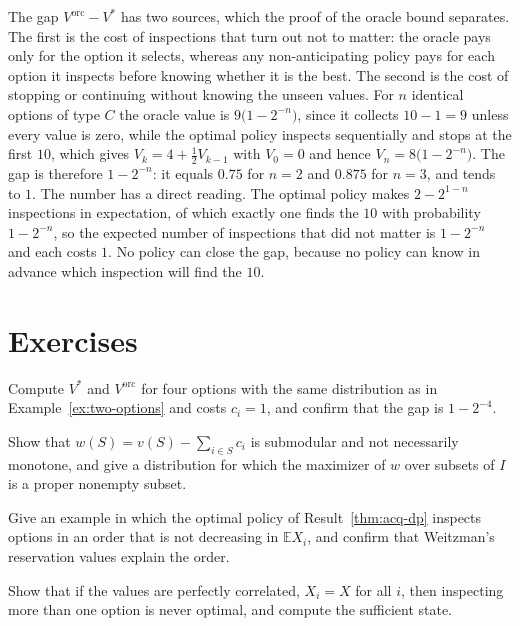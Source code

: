 The gap $V^{\mathrm{orc}}-V^{*}$ has two sources, which the proof of the oracle bound separates. The first is the cost of inspections that turn out not to matter: the oracle pays only for the option it selects, whereas any non-anticipating policy pays for each option it inspects before knowing whether it is the best. The second is the cost of stopping or continuing without knowing the unseen values. For $n$ identical options of type $C$ the oracle value is $9\bigl(1-2^{-n}\bigr)$, since it collects $10-1=9$ unless every value is zero, while the optimal policy inspects sequentially and stops at the first $10$, which gives $V_k=4+\tfrac12V_{k-1}$ with $V_0=0$ and hence $V_n=8\bigl(1-2^{-n}\bigr)$. The gap is therefore $1-2^{-n}$: it equals $0.75$ for $n=2$ and $0.875$ for $n=3$, and tends to $1$. The number has a direct reading. The optimal policy makes $2-2^{1-n}$ inspections in expectation, of which exactly one finds the $10$ with probability $1-2^{-n}$, so the expected number of inspections that did not matter is $1-2^{-n}$ and each costs $1$. No policy can close the gap, because no policy can know in advance which inspection will find the $10$.

\section*{Exercises}

\begin{exercise}
Compute $V^{*}$ and $V^{\mathrm{orc}}$ for four options with the same distribution as in Example~\ref{ex:two-options} and costs $c_i=1$, and confirm that the gap is $1-2^{-4}$.
\end{exercise}

\begin{exercise}\label{ex:marginal}
Show that $w(S)=v(S)-\sum_{i\in S}c_i$ is submodular and not necessarily monotone, and give a distribution for which the maximizer of $w$ over subsets of $I$ is a proper nonempty subset.
\end{exercise}

\begin{exercise}
Give an example in which the optimal policy of Result~\ref{thm:acq-dp} inspects options in an order that is not decreasing in $\mathbb E X_i$, and confirm that Weitzman's reservation values explain the order.
\end{exercise}

\begin{exercise}
Show that if the values are perfectly correlated, $X_i=X$ for all $i$, then inspecting more than one option is never optimal, and compute the sufficient state.
\end{exercise}

